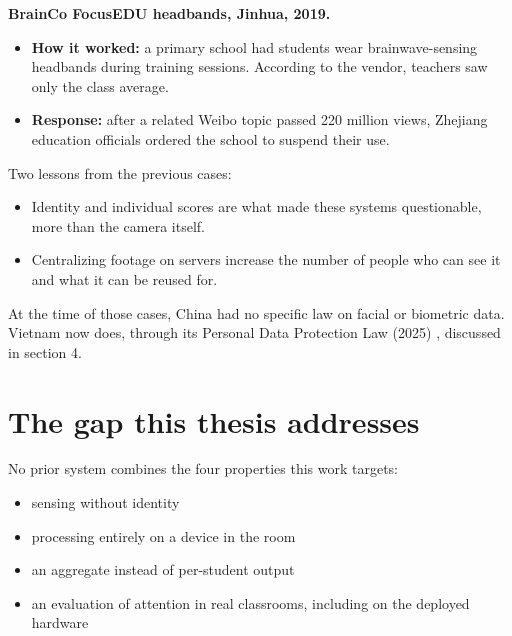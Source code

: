 \textbf{BrainCo FocusEDU headbands, Jinhua, 2019. \cite{b11}}

\begin{itemize}
\tightlist
\item
  \textbf{How it worked:} a primary school had students wear brainwave-sensing headbands during training sessions. According to the vendor, teachers saw only the class average.
\item
  \textbf{Response:} after a related Weibo topic passed 220 million views, Zhejiang education officials ordered the school to suspend their use.
\end{itemize}

Two lessons from the previous cases:

\begin{itemize}
\tightlist
\item
  Identity and individual scores are what made these systems questionable, more than the camera itself.
\item
  Centralizing footage on servers increase the number of people who can see it and what it can be reused for.
\end{itemize}

At the time of those cases, China had no specific law on facial or biometric data. Vietnam now does, through its Personal Data Protection Law (2025) \cite{b12}, discussed in section 4.

\section{The gap this thesis addresses}

No prior system combines the four properties this work targets:

\begin{itemize}
\tightlist
\item
  sensing without identity
\item
  processing entirely on a device in the room
\item
  an aggregate instead of per-student output
\item
  an evaluation of attention in real classrooms, including on the deployed hardware
\end{itemize}

